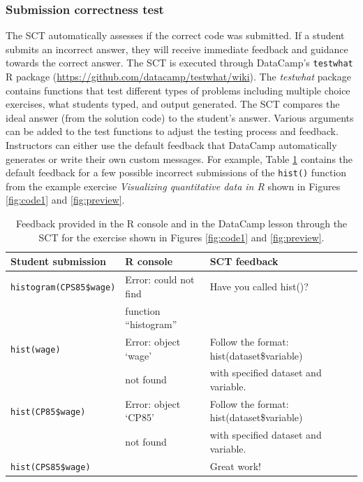 \documentclass{tise_style_doi}
\begin{document}
\subsubsection{Submission correctness test}

The SCT automatically assesses if the correct code was submitted. If a student submits 
an incorrect answer, they will receive immediate feedback and guidance towards
the correct answer.  The SCT is executed through DataCamp's \texttt{testwhat} R
package (\url{https://github.com/datacamp/testwhat/wiki}). The \textit{testwhat} package 
contains functions that test different types of problems including multiple choice
exercises, what students typed, and output generated.  The SCT compares the ideal answer 
(from the solution code) to the student's answer. Various arguments can be added to the 
test functions to adjust the testing process and feedback.  Instructors can either use the 
default feedback that DataCamp automatically generates or write their own custom messages. 
For example, Table \ref{tab:SCT} contains the default feedback for a few possible incorrect submissions 
of the \texttt{hist()} function from the example
exercise \textit{Visualizing quantitative data in R} shown in Figures \ref{fig:code1} and
\ref{fig:preview}.

\begin{table}\label{tab:SCT}
\caption{Feedback provided in the R console and in the DataCamp lesson through the 
SCT for the exercise shown in Figures \ref{fig:code1} and \ref{fig:preview}.}
\begin{tabular}{lll}
\toprule
Student submission & R console & SCT feedback \\
\midrule
\texttt{histogram(CPS85\$wage)} & Error: could not find & Have you called hist()? \\
                                & function ``histogram'' & \\
[2ex]
\texttt{hist(wage)} & Error: object `wage' & Follow the format: hist(dataset\$variable) \\
                    &  not found           & with specified dataset and variable.\\
[2ex]                    
\texttt{hist(CP85\$wage)} & Error: object `CP85' & Follow the format: hist(dataset\$variable) \\
                               & not found       & with specified dataset and variable. \\
[2ex]                                                   
\texttt{hist(CPS85\$wage)} & & Great work! \\
\bottomrule
\end{tabular}
\end{table}
\end{document}

